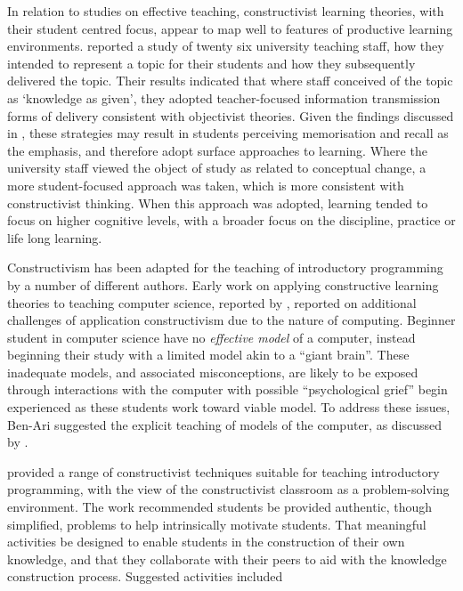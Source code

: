 In relation to studies on effective teaching, constructivist learning theories, with their student centred focus, appear to map well to features of productive learning environments. \citet{Martin:2000} reported a study of twenty six university teaching staff, how they intended to represent a topic for their students and how they subsequently delivered the topic. Their results indicated that where staff conceived of the topic as `knowledge as given', they adopted teacher-focused information transmission forms of delivery consistent with objectivist theories. Given the findings discussed in , these strategies may result in students perceiving memorisation and recall as the emphasis, and therefore adopt surface approaches to learning. Where the university staff viewed the object of study as related to conceptual change, a more student-focused approach was taken, which is more consistent with constructivist thinking. When this approach was adopted, learning tended to focus on higher cognitive levels, with a broader focus on the discipline, practice or life long learning. 


Constructivism has been adapted for the teaching of introductory programming by a number of different authors. Early work on applying constructive learning theories to teaching computer science, reported by \citet{BenAri:1998,BenAri:2001}, reported on additional challenges of application constructivism due to the nature of computing. Beginner student in computer science have no \emph{effective model} of a computer, instead beginning their study with a limited model akin to a ``giant brain''. These inadequate models, and associated misconceptions, are likely to be exposed through interactions with the computer with possible ``psychological grief'' begin experienced as these students work toward viable model. To address these issues, Ben-Ari suggested the explicit teaching of models of the computer, as discussed by \citet{DuBoulay:1986}. 

\citet{VanGorp:2001} provided a range of constructivist techniques suitable for teaching introductory programming, with the view of the constructivist classroom as a problem-solving environment. The work recommended students be provided authentic, though simplified, problems to help intrinsically motivate students. That meaningful activities be designed to enable students in the construction of their own knowledge, and that they collaborate with their peers to aid with the knowledge construction process. Suggested activities included

